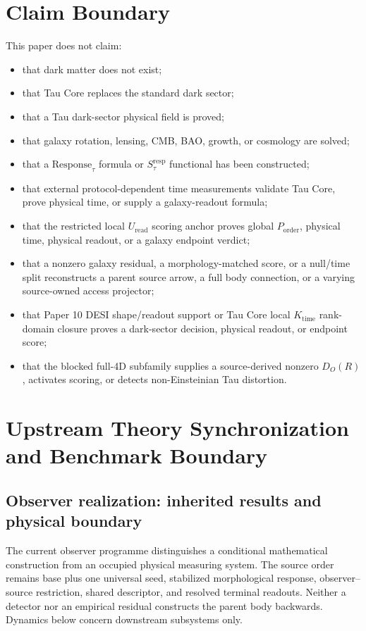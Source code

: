 \documentclass[11pt]{article}
\begin{document}
\section{Claim Boundary}

This paper does not claim:
\begin{itemize}
\item that dark matter does not exist;
\item that Tau Core replaces the standard dark sector;
\item that a Tau dark-sector physical field is proved;
\item that galaxy rotation, lensing, CMB, BAO, growth, or cosmology are solved;
\item that a \(\mathrm{Response}_{\tau}\) formula or
\(S_{\tau}^{\mathrm{resp}}\) functional has been constructed;
\item that external protocol-dependent time measurements validate Tau Core,
prove physical time, or supply a galaxy-readout formula;
\item that the restricted local \(U_{\mathrm{read}}\) scoring anchor proves
global \(P_{\mathrm{order}}\), physical time, physical readout, or a galaxy
endpoint verdict;
\item that a nonzero galaxy residual, a morphology-matched score, or a
null/time split reconstructs a parent source arrow, a full body connection, or
a varying source-owned access projector;
\item that Paper 10 DESI shape/readout support or Tau Core local
\(K_{\mathrm{time}}\) rank-domain closure proves a dark-sector decision,
physical readout, or endpoint score;
\item that the blocked full-4D subfamily supplies a source-derived nonzero
\(D_O(R)\), activates scoring, or detects non-Einsteinian Tau distortion.
\end{itemize}

\section{Upstream Theory Synchronization and Benchmark Boundary}
\label{sec:upstream-sync}

\subsection{Observer realization: inherited results and physical boundary}
\label{sec:observer-update-20260914}
The current observer programme distinguishes a conditional mathematical
construction from an occupied physical measuring system. The source order
remains base plus one universal seed, stabilized morphological response,
observer--source restriction, shared descriptor, and resolved terminal
readouts. Neither a detector nor an empirical residual constructs the parent
body backwards. Dynamics below concern downstream subsystems only.
\end{document}
